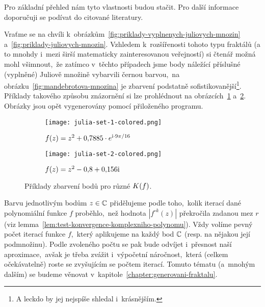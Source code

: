 Pro základní přehled nám tyto vlastnosti budou stačit. Pro další informace doporučuji se podívat do citované literatury.

Vraťme se na chvíli k~obrázkům~\ref{fig:priklady-vyplnenych-juliovych-mnozin} a~\ref{fig:priklady-juliovych-mnozin}. Vzhledem k~rozšířenosti tohoto typu fraktálů (a to mnohdy i~mezi širší matematicky zainteresovanou veřejností) si čtenář možná mohl všimnout,~že zatímco v~těchto případech jsme body náležící příslušné (vyplněné) Juliově množině vybarvili černou barvou,~na obrázku~\ref{fig:mandebrotova-mnozina} je zbarvení podstatně sofistikovanější\footnote{A leckdo by jej nejspíše shledal i~krásnějším.}. Příklady takového způsobu znázornění si lze prohlédnout na obrázcích~\ref{subfig:vyplnena-juliova-mnozina-1-obarveno} a~\ref{subfig:vyplnena-juliova-mnozina-2-obarveno}. Obrázky jsou opět vygenerovány pomocí přiloženého programu.
\begin{figure}[h]
    \centering
    \begin{subfigure}{0.48\textwidth}
        \centering
        \texttt{[image: julia-set-1-colored.png]}
        \caption{$f(z)=z^2 + 0{,}7885\cdot e^{\textrm{i}\cdot9\pi/16}$}
        \label{subfig:vyplnena-juliova-mnozina-1-obarveno}
    \end{subfigure}
    \quad
    \begin{subfigure}{0.48\textwidth}
        \centering
        \texttt{[image: julia-set-2-colored.png]}
        \caption{$f(z)=z^2 - 0{,}8 + 0{,}156\textrm{i}$}
        \label{subfig:vyplnena-juliova-mnozina-2-obarveno}
    \end{subfigure}
    \caption{Příklady zbarvení bodů pro různé $K(f)$.}
    \label{fig:priklady-vyplnenych-juliovych-mnozin-obarveno}
\end{figure}

Barvu jednotlivým bodům $z\in\mathbb{C}$ přidělujeme podle toho,~kolik iterací dané polynomiální funkce $f$ proběhlo,~než hodnota $|f^{\circ k}(z)|$ překročila zadanou mez $r$ (viz lemma~\ref{lem:test-konvergence-komplexniho-polynomu}). Vždy volíme pevný počet iterací funkce $f$,~který aplikujeme na každý bod $\mathbb{C}$ (resp. na nějakou její podmnožinu). Podle zvoleného počtu se pak bude odvíjet i~přesnost naší aproximace,~avšak je třeba zvážit i~výpočetní náročnost,~která (celkem očekávatelně) roste se zvyšujícím se počtem iterací. Tomuto tématu (a~mnohým dalším) se budeme věnovat v~kapitole~\ref{chapter:generovani-fraktalu}.
 
